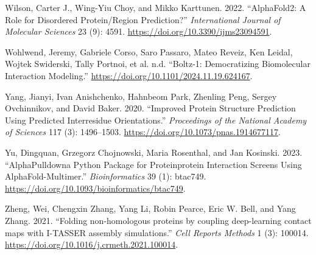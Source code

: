 \documentclass[
]{scrbook}
\newlength{\cslhangindent}
\newenvironment{CSLReferences}[2] %
 {\begin{list}{}{%
  \setlength{\itemindent}{0pt}
  \setlength{\leftmargin}{0pt}
  \setlength{\parsep}{0pt}
  \ifodd #1
   \setlength{\leftmargin}{\cslhangindent}
   \setlength{\itemindent}{-1\cslhangindent}
  \fi
  \setlength{\itemsep}{#2\baselineskip}}}
 {\end{list}}
\begin{document}
\begin{CSLReferences}{1}{0}
Wilson, Carter J., Wing-Yiu Choy, and Mikko Karttunen. 2022.
{``AlphaFold2: A Role for Disordered Protein/Region Prediction?''}
\emph{International Journal of Molecular Sciences} 23 (9): 4591.
\url{https://doi.org/10.3390/ijms23094591}.

Wohlwend, Jeremy, Gabriele Corso, Saro Passaro, Mateo Reveiz, Ken
Leidal, Wojtek Swiderski, Tally Portnoi, et al. n.d. {``Boltz-1:
Democratizing Biomolecular Interaction Modeling.''}
\url{https://doi.org/10.1101/2024.11.19.624167}.

Yang, Jianyi, Ivan Anishchenko, Hahnbeom Park, Zhenling Peng, Sergey
Ovchinnikov, and David Baker. 2020. {``Improved Protein Structure
Prediction Using Predicted Interresidue Orientations.''}
\emph{Proceedings of the National Academy of Sciences} 117 (3):
1496--1503. \url{https://doi.org/10.1073/pnas.1914677117}.

Yu, Dingquan, Grzegorz Chojnowski, Maria Rosenthal, and Jan Kosinski.
2023. {``AlphaPulldown{\textemdash}a Python Package for
Protein{\textendash}protein Interaction Screens Using
AlphaFold-Multimer.''} \emph{Bioinformatics} 39 (1): btac749.
\url{https://doi.org/10.1093/bioinformatics/btac749}.

Zheng, Wei, Chengxin Zhang, Yang Li, Robin Pearce, Eric W. Bell, and
Yang Zhang. 2021. {``Folding non-homologous proteins by coupling
deep-learning contact maps with I-TASSER assembly simulations.''}
\emph{Cell Reports Methods} 1 (3): 100014.
\url{https://doi.org/10.1016/j.crmeth.2021.100014}.

\end{CSLReferences}


\backmatter
\end{document}
